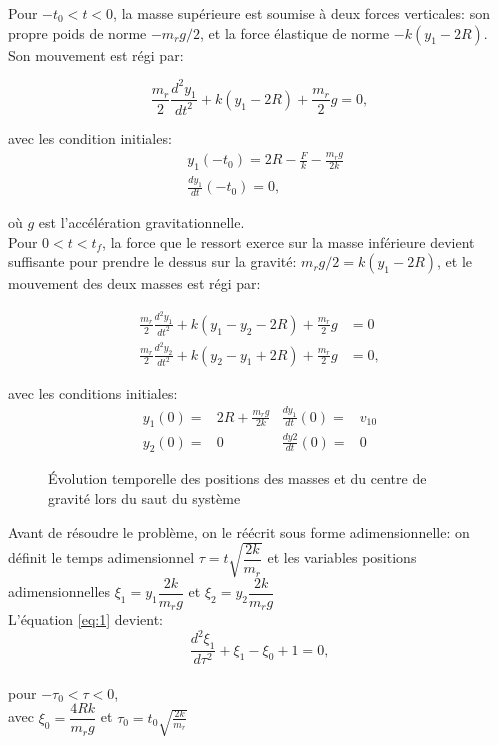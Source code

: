Pour $-t_0<t<0$, la masse supérieure est soumise à deux forces verticales: son propre poids de norme $-m_r g/2$, et la force élastique de norme $-k(y_1-2R)$. Son mouvement est régi par:

\begin{equation}
    \frac{m_r}{2}\frac{d^2y_1}{dt^2}+k(y_1-2R)+\frac{m_r}{2}g=0,
  \label{eq:1}
\end{equation}

avec les condition initiales:
\begin{align}
    &y_1(-t_0)=2R-\frac{F}{k}-\frac{m_r g}{2k} \nonumber\\
    &\frac{dy_1}{dt}(-t_0)=0,
\label{eq:1i}
\end{align}

où $g$ est l'accélération gravitationnelle. \\
  
Pour $0<t<t_f$, la force que le ressort exerce sur la masse inférieure devient suffisante pour prendre le dessus sur la gravité: $m_r g/2=k(y_1-2R)$,  et le mouvement des deux masses est régi par:

\begin{align}
    \frac{m_r}{2}\frac{d^2y_1}{dt^2}+k(y_1-y_2-2R)+\frac{m_r}{2}g&=0 \nonumber\\
    \frac{m_r}{2}\frac{d^2y_2}{dt^2}+k(y_2-y_1+2R)+\frac{m_r}{2}g&=0,
  \label{eq:3}
\end{align}

avec les conditions initiales: 
\begin{align}
    y_1(0)=&2R+\frac{m_r g}{2k} & \frac{d y_1}{dt}(0)=&v_{10}\nonumber\\
    y_2(0)=&0 & \frac{d y2}{dt}(0)=&0
  \label{eq:4}
\end{align}    
    

\begin{figure}[htb]
\centering
\def\svgwidth{350}


\caption{Évolution temporelle des positions des masses et du centre de gravité lors du saut du système}
\label{fig:saut}
\end{figure}

Avant de résoudre le problème, on le réécrit sous forme adimensionnelle:
on définit le temps adimensionnel $\tau=t\sqrt{\dfrac{2k}{m_r}}$ et les variables positions adimensionnelles $\xi_1=y_1 \dfrac{2k}{m_r g}$ et $\xi_2=y_2 \dfrac{2k}{m_r g}$ \\

 L'équation \ref{eq:1} devient:
\begin{equation}
    \frac{d^2\xi_1}{d\tau^2}+\xi_1-\xi_0+1=0,
  \label{eq:1a}
\end{equation}
\\
pour $-\tau_0<\tau<0$,\\
avec $\xi_0=\dfrac{4Rk}{m_r g}$ et $\tau_0=t_0 \sqrt{\frac{2k}{m_r}}$ \\

